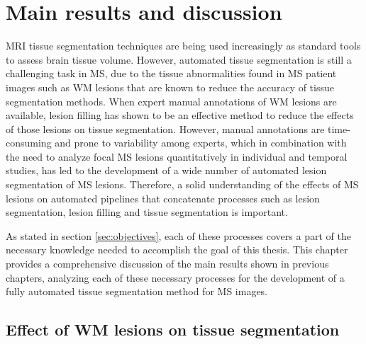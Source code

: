
\chapter{Main results and discussion}

MRI tissue segmentation techniques are being used increasingly as standard tools to assess brain tissue volume. However, automated tissue segmentation is still a challenging task in MS, due to the tissue abnormalities found in MS patient images such as WM lesions that are known to reduce the accuracy of tissue segmentation methods. When expert manual annotations of WM lesions are available, lesion filling has shown to be an effective method to reduce the effects of those lesions on tissue segmentation. However, manual annotations are time-consuming and prone to variability among experts, which in combination with the need to analyze focal MS lesions quantitatively in individual and temporal studies, has led to the development of a wide number of automated lesion segmentation of MS lesions. Therefore, a solid understanding of the effects of MS lesions on automated pipelines that concatenate processes such as lesion segmentation, lesion filling and tissue segmentation is important. 

As stated in section \ref{sec:objectives}, each of these processes covers a part of the necessary knowledge needed to accomplish the goal of this thesis. This chapter provides a comprehensive discussion of the main results shown in previous chapters, analyzing each of these necessary processes for the development of a fully automated tissue segmentation method for MS images.

\section{Effect of WM lesions on tissue segmentation}

